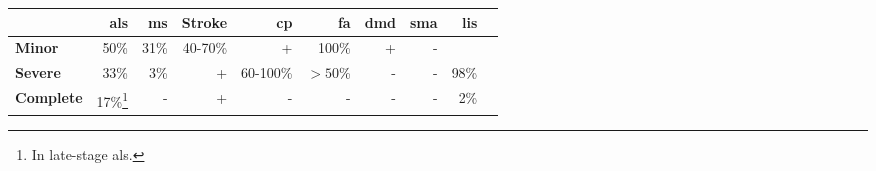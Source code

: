 \begin{tabularx}{\textwidth}{Xrrrrrrrrr}
\toprule
    & \bfseries \acs{als} & \bfseries \acs{ms}   & \bfseries Stroke
    & \bfseries \acs{cp} & \bfseries\acs{fa} & \bfseries \acs{dmd} & \bfseries \acs{sma} & \bfseries \acs{lis} \\ \midrule
    \bfseries Minor    & 50\% & 31\% & 40-70\% & + & 100\% & + & - &      \\
    \bfseries Severe   & 33\% & 3\%  & +       & 60-100\% & $>50$\% &  - & - & 98\% \\
    \bfseries Complete & 17\%\footnote{In late-stage \ac{als}.} & -    & +
    & -&- & - & - & 2\%  \\
\bottomrule
\end{tabularx}
